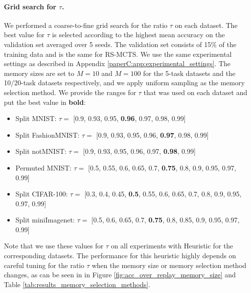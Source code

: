\paragraph{Grid search for $\tau$.} We performed a coarse-to-fine grid search for the ratio $\tau$ on each dataset. The best value for $\tau$ is selected according to the highest mean accuracy on the validation set averaged over 5 seeds. The validation set consists of 15\% of the training data and is the same for RS-MCTS. We use the same experimental settings as described in Appendix \ref{paperC:app:experimental_settings}. The memory sizes are set to $M=10$ and $M=100$ for the 5-task datasets and the 10/20-task datasets respectively, and we apply uniform sampling as the memory selection method. We provide the ranges for $\tau$ that was used on each dataset and put the best value in \textbf{bold}:
\begin{itemize}[topsep=1pt,noitemsep,leftmargin=*]
	\item Split MNIST: $\tau =$ [0.9, 0.93, 0.95, \textbf{0.96}, 0.97, 0.98, 0.99]
	\item Split FashionMNIST: $\tau =$ [0.9, 0.93, 0.95, 0.96, \textbf{0.97}, 0.98, 0.99]
	\item Split notMNIST: $\tau =$ [0.9, 0.93, 0.95, 0.96, 0.97, \textbf{0.98}, 0.99]
	\item Permuted MNIST: $\tau =$ [0.5, 0.55, 0.6, 0.65, 0.7, \textbf{0.75}, 0.8, 0.9, 0.95, 0.97, 0.99]
	\item Split CIFAR-100: $\tau =$ [0.3, 0.4, 0.45, \textbf{0.5}, 0.55, 0.6, 0.65, 0.7, 0.8, 0.9, 0.95, 0.97, 0.99]
	\item  Split miniImagenet: $\tau =$ [0.5, 0.6, 0.65, 0.7, \textbf{0.75}, 0.8, 0.85, 0.9, 0.95, 0.97, 0.99]
\end{itemize}
Note that we use these values for $\tau$ on all experiments with Heuristic for the corresponding datasets. The performance for this heuristic highly depends on careful tuning for the ratio $\tau$ when the memory size or memory selection method changes, as can be seen in in Figure \ref{fig:acc_over_replay_memory_size} and Table \ref{tab:results_memory_selection_methods}. 

